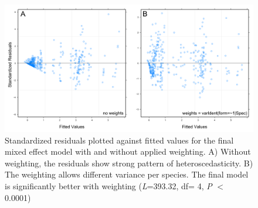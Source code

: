 \clearpage

\begin{figure} [H] %
\centering
\includegraphics[width=15cm]{Images/residuals}
 \caption{Standardized residuals plotted against fitted values for the final mixed effect model with and without applied weighting. A) Without weighting, the residuals show strong pattern of heteroscedasticity. B) The weighting allows different variance per species. The final model is significantly better with weighting (\textit{L}=393.32, df= 4, \textit{P} $<$ 0.0001)}
 \label{fig:residuals}
\end{figure}


